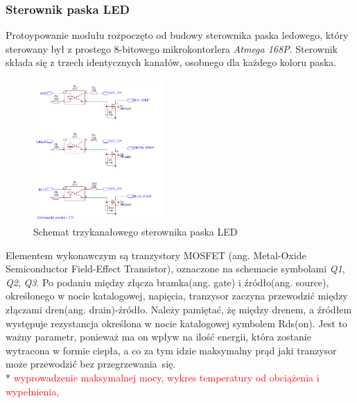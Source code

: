 \documentclass[12pt, eng, twoside, openany, final]{mgr}
\begin{document}
            \subsubsection{Sterownik paska LED}
                Protoypowanie modułu rozpoczęto od budowy sterownika paska ledowego, który sterowany był z prostego 8-bitowego mikrokontorlera \emph{Atmega 168P}. 
                Sterownik składa się z trzech identycznych kanałów, osobnego dla każdego koloru paska. 
                \begin{figure}[H]
                \begin{center}
                    \includegraphics[width=0.45\textwidth]{sterownik.png}
                    \caption{Schemat trzykanałowego sterownika paska LED}
                \end{center}
                \end{figure}
                Elementem wykonawczym są tranzystory MOSFET (ang. Metal-Oxide Semiconductor Field-Effect Transistor), oznaczone na schemacie symbolami \emph{Q1}, \emph{Q2}, \emph{Q3}. Po podaniu między złącza bramka(ang. gate) i źródło(ang. source), określonego w nocie katalogowej, napięcia, tranzysor zaczyna przewodzić między złączami dren(ang. drain)-źródło. Należy pamiętać, żę między drenem, a źródłem występuje rezystancja określona w nocie katalogowej symbolem Rds(on). Jest to ważny parametr, ponieważ ma on wpływ na ilość energii, która zostanie wytracona w formie ciepła, a co za tym idzie maksymalny prąd jaki tranzysor może przewodzić bez przegrzewania~się. \\*
                \textcolor{red}{wyprowadzenie maksymalnej mocy, wykres temperatury od obciążenia i wypełnienia, }
        
                \newpage
        
\end{document}
